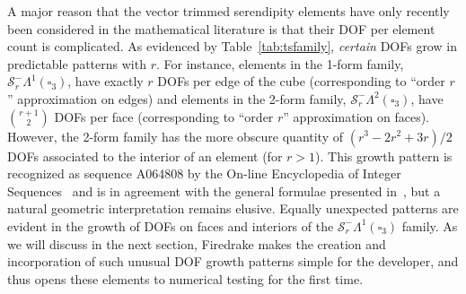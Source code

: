 \documentclass[format=acmsmall,screen,timestamp=false,a4paper]{acmart}
\DeclareMathOperator{\Div}{div}
\DeclareMathOperator{\curl}{curl}
\newcommand\akg[1]{\textbf{\textcolor[rgb]{.5,0,1}{[Andrew: #1]}}}
\newcommand{\calS}{\mathcal{S}}
\newcommand{\hcurl}{\ensuremath{{H}(\curl ) } }
\newcommand{\hdiv}{\ensuremath{{H}(\Div ) } }
\begin{document}
	
	A major reason that the vector trimmed serendipity elements have only recently been considered in the mathematical literature is that their DOF per element count is complicated.
	As evidenced by Table~\ref{tab:tsfamily}, \textit{certain} DOFs grow in predictable patterns with $r$.
	For instance, elements in the 1-form family, $\calS_r^-\Lambda^1(\square_3)$, have exactly $r$ DOFs per edge of the cube (corresponding to ``order $r$'' approximation on edges) and elements in the 2-form family, $\calS_r^-\Lambda^2(\square_3)$, have ${\displaystyle {r+1}\choose 2}$ DOFs per face (corresponding to ``order $r$'' approximation on faces).
	However, the 2-form family has the more obscure quantity of $(r^3 - 2r^2 + 3r)/2$ DOFs associated to the interior of an element (for $r>1$).
	This growth pattern is recognized as sequence A064808 by the On-line Encyclopedia of Integer Sequences~\cite{OEIS} and is in agreement with the general formulae presented in~\cite{gillette2019trimmed}, but a natural geometric interpretation remains elusive.
	Equally unexpected patterns are evident in the growth of DOFs on faces and interiors of the $\calS_r^-\Lambda^1(\square_3)$ family.
	As we will discuss in the next section, Firedrake makes the creation and incorporation of such unusual DOF growth patterns simple for the developer, and thus opens these elements to numerical testing for the first time.
	
%	
%
%	
%  
%	
%
%
%  
%  
  
\end{document}

